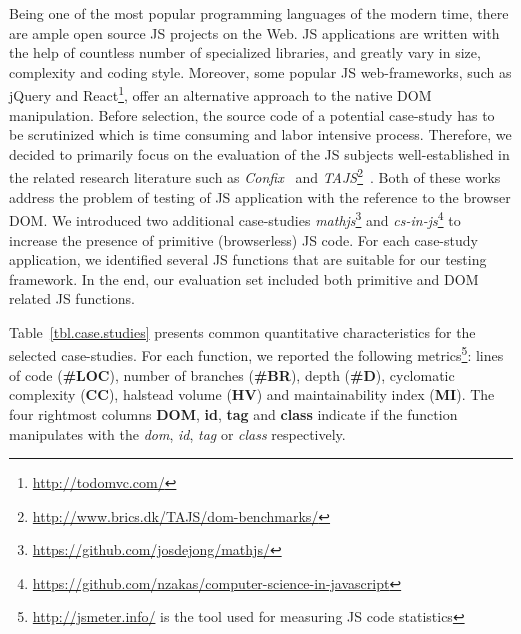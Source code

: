\documentclass[sigconf]{acmart}
\begin{document}
Being one of the most popular programming languages of the modern time, there are ample open source JS projects on the Web. JS applications are written with the help of countless number of specialized libraries, and greatly vary in size, complexity and coding style. Moreover, some popular JS web-frameworks, such as jQuery and React\footnote{\url{http://todomvc.com/}}, offer an alternative approach to the native DOM manipulation. Before selection, the source code of a potential case-study has to be scrutinized which is time consuming and labor intensive process. Therefore, we decided to primarily focus on the evaluation of the JS subjects well-established in the related research literature such as \emph{Confix}~\cite{amin:ase15} and \emph{TAJS}\footnote{\url{http://www.brics.dk/TAJS/dom-benchmarks/}}~\cite{dom2011}. Both of these works address the problem of testing of JS application with the reference to the browser DOM. We introduced two additional case-studies \emph{mathjs}\footnote{\url{https://github.com/josdejong/mathjs/}} and \emph{cs-in-js}\footnote{\url{https://github.com/nzakas/computer-science-in-javascript}} to increase the presence of primitive (browserless) JS code. For each case-study application, we identified several JS functions that are suitable for our testing framework. In the end, our evaluation set included both primitive and DOM related JS functions.

Table~\ref{tbl.case.studies} presents common quantitative characteristics for the selected case-studies. For each function, we reported the following metrics\footnote{\url{http://jsmeter.info/} is the tool used for measuring JS code statistics}: lines of code (\textbf{\#LOC}), number of branches (\textbf{\#BR}), depth (\textbf{\#D}), cyclomatic complexity (\textbf{CC}), halstead volume (\textbf{HV}) and maintainability index (\textbf{MI}). The four rightmost columns \textbf{DOM}, \textbf{id}, \textbf{tag} and \textbf{class} indicate if the function manipulates with the \emph{dom}, \emph{id}, \emph{tag} or \emph{class} respectively.      
\end{document}
